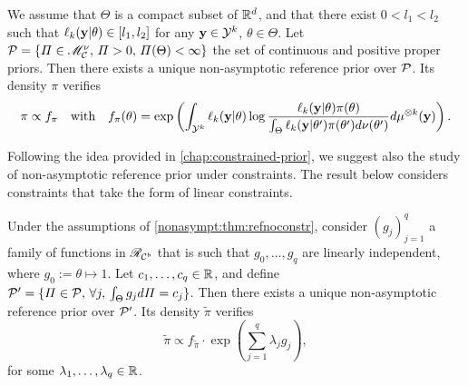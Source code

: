\begin{thm}\label{nonasympt:thm:refnoconstr}
    We assume that $\Theta$ is a compact subset of $\mathbb{R}^d$, and that there exist $0<l_1<l_2$ such that $\ell_k(\mathbf{y}|\theta)\in[l_1,l_2]$ for any $\mathbf{y}\in\mathcal{Y}^k$, $\theta\in\Theta$. Let $\mathcal{P}=\{\varPi\in\mathscr{M}^\nu_{\mathcal{C}},\,\varPi>0,\,\varPi(\Theta)<\infty\}$ the set of continuous and positive proper priors. Then there exists a unique non-asymptotic reference prior over $\mathcal{P}$. Its density $\pi$ verifies
        \begin{equation}
            \pi\propto f_\pi\quad\text{with}\quad f_\pi(\theta) = \exp\left(\int_{\mathcal{Y}^k}\ell_k(\mathbf{y}|\theta)\log\frac{\ell_k(\mathbf{y}|\theta)\pi(\theta)}{\int_{\Theta}\ell_k(\mathbf{y}|\theta')\pi(\theta')d\nu(\theta')}d\mu^{\otimes k}(\mathbf{y})\right).
        \end{equation}
\end{thm}


Following the idea provided in \cref{chap:constrained-prior}, we suggest also the study of non-asymptotic reference prior under constraints. The result below considers constraints that take the form of linear constraints. 


\begin{thm}\label{nonasympt:thm:constr}
    Under the assumptions of \cref{nonasympt:thm:refnoconstr}, consider $(g_j)_{j=1}^q$ a family of functions in $\mathscr{R}_{\mathcal{C}^b}$ that is such that $g_0,\dots,g_q$ are linearly independent, where $g_0:=\theta\mapsto 1$. Let $c_1,\dots,c_q\in\mathbb{R}$, and define $\mathcal{P}'=\{\varPi\in\mathcal{P},\,\forall j,\, \int_\Theta g_jd\varPi=c_j\}$. Then there exists a unique non-asymptotic reference prior over $\mathcal{P}'$. Its density $\tilde\pi$ verifies 
        \begin{equation}
            \tilde\pi\propto f_{\tilde\pi}\cdot\exp\left(\sum_{j=1}^q\lambda_jg_j\right),
        \end{equation}
    for some $\lambda_1,\dots,\lambda_q\in\mathbb{R}$.
\end{thm}



